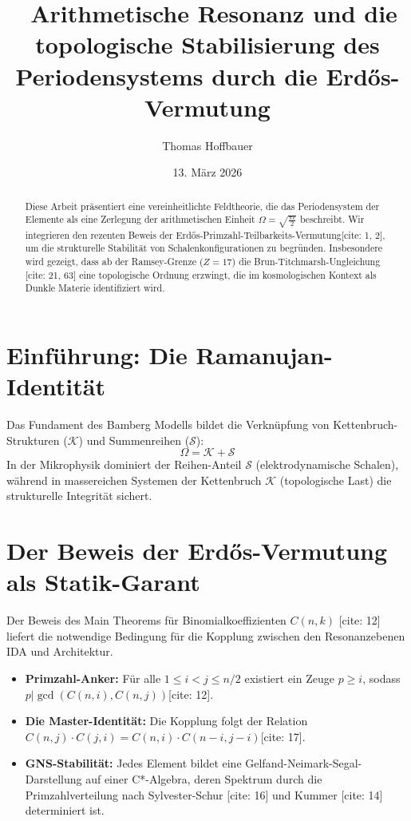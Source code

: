 \documentclass[11pt,a4paper]{article}
\title{\textbf{\ Arithmetische Resonanz und die topologische Stabilisierung des Periodensystems durch die Erdős-Vermutung}}
\author{Thomas Hoffbauer}
\date{13. März 2026}
\begin{document}
	
	\maketitle
	
	\begin{abstract}
		Diese Arbeit präsentiert eine vereinheitlichte Feldtheorie, die das Periodensystem der Elemente als eine Zerlegung der arithmetischen Einheit $\Omega = \sqrt{\frac{\pi e}{2}}$ beschreibt. Wir integrieren den rezenten Beweis der Erdős-Primzahl-Teilbarkeits-Vermutung[cite: 1, 2], um die strukturelle Stabilität von Schalenkonfigurationen zu begründen. Insbesondere wird gezeigt, dass ab der Ramsey-Grenze ($Z=17$) die Brun-Titchmarsh-Ungleichung [cite: 21, 63] eine topologische Ordnung erzwingt, die im kosmologischen Kontext als Dunkle Materie identifiziert wird.
	\end{abstract}
	
	\section{Einführung: Die Ramanujan-Identität}
	Das Fundament  des Bamberg Modells bildet die Verknüpfung von Kettenbruch-Strukturen ($\mathcal{K}$) und Summenreihen ($\mathcal{S}$):
	\begin{equation}
		\Omega = \mathcal{K} + \mathcal{S}
	\end{equation}
	In der Mikrophysik dominiert der Reihen-Anteil $\mathcal{S}$ (elektrodynamische Schalen), während in massereichen Systemen der Kettenbruch $\mathcal{K}$ (topologische Last) die strukturelle Integrität sichert.
	
	\section{Der Beweis der Erdős-Vermutung als Statik-Garant}
	Der Beweis des Main Theorems für Binomialkoeffizienten $C(n,k)$ [cite: 12] liefert die notwendige Bedingung für die Kopplung zwischen den Resonanzebenen IDA und Architektur.
	\begin{itemize}
		\item \textbf{Primzahl-Anker:} Für alle $1 \le i < j \le n/2$ existiert ein Zeuge $p \ge i$, sodass $p | \gcd(C(n,i), C(n,j))$[cite: 12].
		\item \textbf{Die Master-Identität:} Die Kopplung folgt der Relation $C(n,j) \cdot C(j,i) = C(n,i) \cdot C(n-i, j-i)$[cite: 17].
		\item \textbf{GNS-Stabilität:} Jedes Element bildet eine Gelfand-Neimark-Segal-Darstellung auf einer C*-Algebra, deren Spektrum durch die Primzahlverteilung nach Sylvester-Schur [cite: 16] und Kummer [cite: 14] determiniert ist.
	\end{itemize}
	
\end{document}
